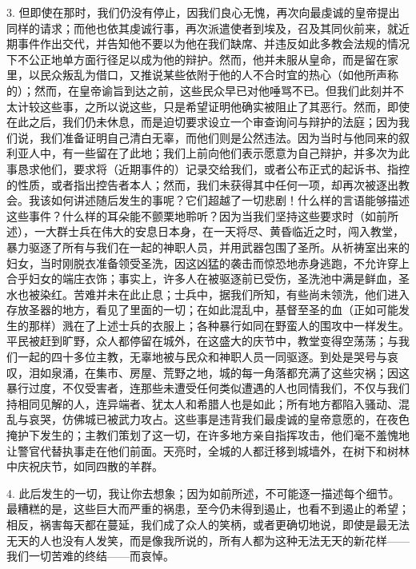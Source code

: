 3. 但即使在那时，我们仍没有停止，因我们良心无愧，再次向最虔诚的皇帝提出同样的请求；而他也依其虔诚行事，再次派遣使者到埃及，召及其同伙前来，就近期事件作出交代，并告知他不要以为他在我们缺席、并违反如此多教会法规的情况下不公正地单方面行径足以成为他的辩护。然而，他并未服从皇命，而是留在家里，以民众叛乱为借口，又推说某些依附于他的人不合时宜的热心（如他所声称的）；然而，在皇帝谕旨到达之前，这些民众早已对他唾骂不已。但我们此刻并不太计较这些事，之所以说这些，只是希望证明他确实被阻止了其恶行。然而，即使在此之后，我们仍未休息，而是迫切要求设立一个审查询问与辩护的法庭；因为我们说，我们准备证明自己清白无辜，而他们则是公然违法。因为当时与他同来的叙利亚人中，有一些留在了此地；我们上前向他们表示愿意为自己辩护，并多次为此事恳求他们，要求将（近期事件的）记录交给我们，或者公布正式的起诉书、指控的性质，或者指出控告者本人；然而，我们未获得其中任何一项，却再次被逐出教会。我该如何讲述随后发生的事呢？它们超越了一切悲剧！什么样的言语能够描述这些事件？什么样的耳朵能不颤栗地聆听？因为当我们坚持这些要求时（如前所述），一大群士兵在伟大的安息日本身，在一天将尽、黄昏临近之时，闯入教堂，暴力驱逐了所有与我们在一起的神职人员，并用武器包围了圣所。从祈祷室出来的妇女，当时刚脱衣准备领受圣洗，因这凶猛的袭击而惊恐地赤身逃跑，不允许穿上合乎妇女的端庄衣饰；事实上，许多人在被驱逐前已受伤，圣洗池中满是鲜血，圣水也被染红。苦难并未在此止息；士兵中，据我们所知，有些尚未领洗，他们进入存放圣器的地方，看见了里面的一切；在如此混乱中，基督至圣的血（正如可能发生的那样）溅在了上述士兵的衣服上；各种暴行如同在野蛮人的围攻中一样发生。平民被赶到旷野，众人都停留在城外，在这盛大的庆节中，教堂变得空荡荡；与我们一起的四十多位主教，无辜地被与民众和神职人员一同驱逐。到处是哭号与哀叹，泪如泉涌，在集市、房屋、荒野之地，城的每一角落都充满了这些灾祸；因这暴行过度，不仅受害者，连那些未遭受任何类似遭遇的人也同情我们，不仅与我们持相同见解的人，连异端者、犹太人和希腊人也是如此；所有地方都陷入骚动、混乱与哀哭，仿佛城已被武力攻占。这些事是违背我们最虔诚的皇帝意愿的，在夜色掩护下发生的；主教们策划了这一切，在许多地方亲自指挥攻击，他们毫不羞愧地让警官代替执事走在他们前面。天亮时，全城的人都迁移到城墙外，在树下和树林中庆祝庆节，如同四散的羊群。\par

4. 此后发生的一切，我让你去想象；因为如前所述，不可能逐一描述每个细节。最糟糕的是，这些巨大而严重的祸患，至今仍未得到遏止，也看不到遏止的希望；相反，祸害每天都在蔓延，我们成了众人的笑柄，或者更确切地说，即使是最无法无天的人也没有人发笑，而是像我所说的，所有人都为这种无法无天的新花样——我们一切苦难的终结——而哀悼。\par

